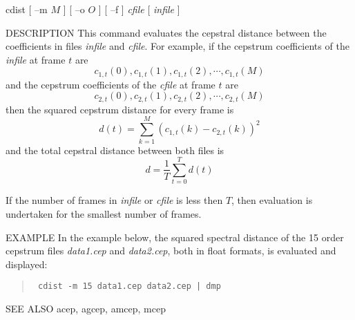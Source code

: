 
\begin{synopsis}
\item [cdist] [ --m $M$ ] [ --o $O$ ] [ --f ] {\em cfile}
 	    [ {\em infile} ] 
\end{synopsis}

\begin{qsection}{DESCRIPTION}
This command evaluates the cepstral distance between the coefficients in
 files {\em infile} and {\em cfile}.
For example, if the cepstrum coefficients of the {\em infile} at
frame $t$ are 
\[c_{1,t}(0),c_{1,t}(1),c_{1,t}(2),\cdots,c_{1,t}(M)\]
and the cepstrum coefficients of the {\em cfile} at frame $t$ are
\[c_{2,t}(0),c_{2,t}(1),c_{2,t}(2),\cdots,c_{2,t}(M)\]
then the squared cepstrum distance for every frame is
\[d(t)=\sum_{k=1}^{M} (c_{1,t}(k)-c_{2,t}(k))^2\]
and the total cepstral distance between both files is
\[d=\frac{1}{T} \sum_{t=0}^{T} d(t)\]

If the number of frames in {\em infile} or {\em cfile} is less
then $T$, then evaluation is undertaken for the smallest number of frames.
\end{qsection}

\begin{options}
\end{options}

\begin{qsection}{EXAMPLE}
In the example below, the squared spectral distance of the 15 order
cepstrum files {\em data1.cep} and {\em data2.cep},
both in float formats, is evaluated and displayed:
\begin{quote}
\verb! cdist -m 15 data1.cep data2.cep | dmp !
\end{quote}
\end{qsection}

\begin{qsection}{SEE ALSO}
acep, agcep, amcep, mcep
\end{qsection}
